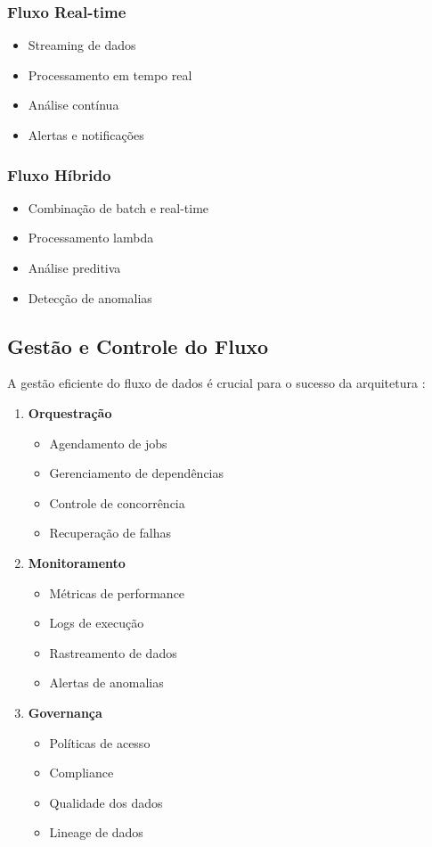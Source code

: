 \subsubsection{Fluxo Real-time}
\begin{itemize}
\item Streaming de dados
\item Processamento em tempo real
\item Análise contínua
\item Alertas e notificações
\end{itemize}

\subsubsection{Fluxo Híbrido}
\begin{itemize}
\item Combinação de batch e real-time
\item Processamento lambda
\item Análise preditiva
\item Detecção de anomalias
\end{itemize}

\subsection{Gestão e Controle do Fluxo}

A gestão eficiente do fluxo de dados é crucial para o sucesso da arquitetura \cite{gade2024data}:

\begin{enumerate}
\item \textbf{Orquestração}
\begin{itemize}
\item Agendamento de jobs
\item Gerenciamento de dependências
\item Controle de concorrência
\item Recuperação de falhas
\end{itemize}
\item \textbf{Monitoramento}
\begin{itemize}
    \item Métricas de performance
    \item Logs de execução
    \item Rastreamento de dados
    \item Alertas de anomalias
\end{itemize}

\item \textbf{Governança}
\begin{itemize}
    \item Políticas de acesso
    \item Compliance
    \item Qualidade dos dados
    \item Lineage de dados
\end{itemize}
\end{enumerate}

